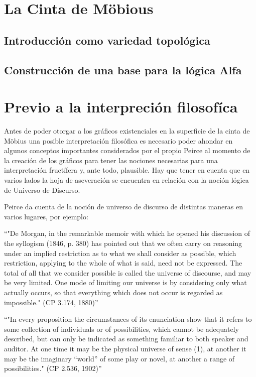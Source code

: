\documentclass[
	fontsize=10pt, %
	twoside=true, %
	secnumdepth=1, %
	abstract=true, %
]{kaohandt}
\begin{document}
\section{La Cinta de Möbious} %
\label{sec:La Cinta de Möbius}

\subsection{Introducción como variedad topológica}


\subsection{Construcción de una base para la lógica Alfa}


\section{Previo a la interpreción filosofíca} %
\label{sec:Previo a la interpreción filosofíca}

Antes de poder otorgar a los gráficos existenciales en la superficie de la cinta de Möbius una posible interpretación filosófica es necesario poder ahondar en algunos conceptos importantes considerados por el propio Peirce al momento de la creación de los gráficos para tener las nociones necesarias para una interpretación fructífera y, ante todo, plausible. Hay que tener en cuenta que en varios lados la hoja de aseveración se encuentra en relación con la noción lógica de Universo de Discurso.

Peirce da cuenta de la noción de universo de discurso de distintas maneras en varios lugares, por ejemplo:

\enquote{"De Morgan, in the remarkable memoir with which he opened his discussion of the syllogism (1846, p. 380) has pointed out that we often carry on reasoning under an implied restriction as to what we shall consider as possible, which restriction, applying to the whole of what is said, need not be expressed. The total of all that we consider possible is called the universe of discourse, and may be very limited. One mode of limiting our universe is by considering only what actually occurs, so that everything which does not occur is regarded as impossible." (CP 3.174, 1880)}

\enquote{"In every proposition the circumstances of its enunciation show that it refers to some collection of individuals or of possibilities, which cannot be adequately described, but can only be indicated as something familiar to both speaker and auditor. At one time it may be the physical universe of sense (1), at another it may be the imaginary “world” of some play or novel, at another a range of possibilities." (CP 2.536, 1902)}
\end{document}
